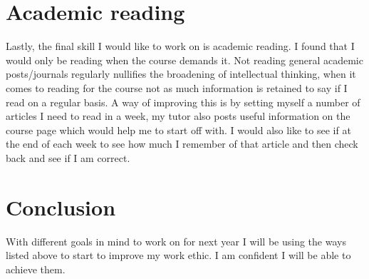 \documentclass{scrartcl}
\begin{document}
\section{Academic reading}

Lastly, the final skill I would like to work on is academic reading. I found that I would only be reading when the course demands it. Not reading general academic posts/journals regularly nullifies the broadening of intellectual thinking, when it comes to reading for the course not as much information is retained to say if I read on a regular basis. A way of improving this is by setting myself a number of articles I need to read in a week, my tutor also posts useful information on the course page which would help me to start off with. I would also like to see if at the end of each week to see how much I remember of that article and then check back and see if I am correct.

\section{Conclusion}
With different goals in mind to work on for next year I will be using the ways listed above to start to improve my work ethic. I am confident I will be able to achieve them.
\end{document}
